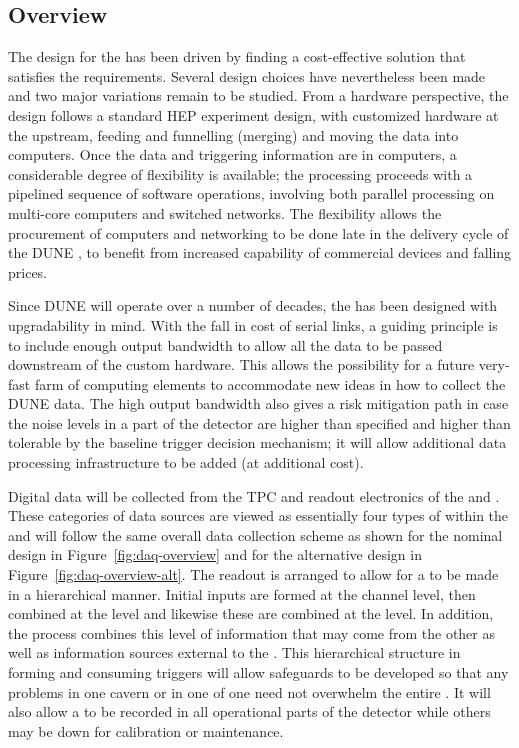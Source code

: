 \subsection{Overview}
\label{sec:fd-daq-overview}

The design for the  has been driven by finding a cost-effective solution that satisfies the requirements. Several design
choices have nevertheless been made and two major variations remain to
be studied. 
From a hardware perspective, the  design follows a standard HEP
experiment design, with customized hardware at the upstream, feeding
and funnelling (merging) and moving the data into computers. 
Once the data and triggering information are in computers, a
considerable degree of flexibility is available;  the processing
proceeds with a pipelined sequence of software operations, involving
both parallel processing on multi-core computers and switched
networks. The flexibility allows the procurement of computers and
networking to be done late in the delivery cycle of the DUNE
, to benefit from increased capability of commercial devices
and falling prices.

Since DUNE will operate over a number of decades, the  has been
designed with upgradability in mind. 
With the fall in cost of serial links, a guiding principle is to
include enough output bandwidth to allow all the data to be passed
downstream of the custom hardware.
This allows the possibility for a future very-fast farm of computing
elements to accommodate new ideas in how to collect the DUNE data. 
The high output bandwidth also gives a risk mitigation path in case
the noise levels in a part of the detector are higher than specified
and higher than tolerable by the baseline trigger decision mechanism;
it will allow additional data processing infrastructure to be added
(at additional cost).

Digital data will be collected from the TPC and 
readout electronics of the \single and \dual
{}. 
These categories of data sources are viewed as essentially four types
of  within the  and will follow the same overall
data collection scheme as shown for the nominal design in
Figure~\ref{fig:daq-overview} and for the alternative design in
Figure~\ref{fig:daq-overview-alt}. 
The readout is arranged to allow for a  to be made
in a hierarchical manner. 
Initial inputs are formed at the channel level, then combined at the
 level and likewise these are combined at the
 level.
In addition, the  process combines this level of
information that may come from the other  as well as
information sources external to the . 
This hierarchical structure in forming and consuming triggers will
allow safeguards to be developed so that any problems in one cavern or
in one  of one  need not overwhelm the
entire .
It will also allow a  to be recorded in all
operational parts of the detector while others may be down for
calibration or maintenance.

